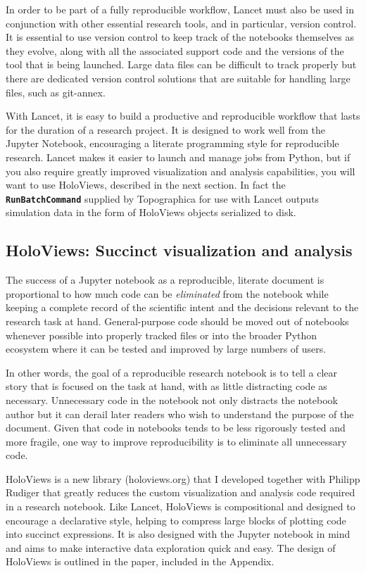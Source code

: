 \documentclass[phd,ianc,twoside]{infthesis}
\newcommand{\tbf}[1]{\texttt{\textbf{#1}}}
\begin{document}
In order to be part of a fully reproducible workflow, Lancet must also
be used in conjunction with other essential research tools, and in
particular, version control. It is essential to use version control to
keep track of the notebooks themselves as they evolve, along with all the
associated support code and the versions of the tool that is being
launched. Large data files can be difficult to track properly but there
are dedicated version control solutions that are suitable for handling
large files, such as \textsf{git-annex}.

With Lancet, it is easy to build a productive and reproducible workflow
that lasts for the duration of a research project. It is designed to
work well from the Jupyter Notebook, encouraging a literate programming
style for reproducible research. Lancet makes it easier to launch and
manage jobs from Python, but if you also require greatly improved
visualization and analysis capabilities, you will want to use HoloViews,
described in the next section. In fact the \tbf{RunBatchCommand}
supplied by Topographica for use with Lancet outputs simulation data in
the form of HoloViews objects serialized to disk.


\subsection{HoloViews: Succinct visualization and analysis}

The success of a Jupyter notebook as a reproducible, literate document
is proportional to how much code can be \emph{eliminated} from the
notebook while keeping a complete record of the scientific intent and the decisions
relevant to the research task at hand. General-purpose code should be
moved out of notebooks whenever possible into properly tracked files or
into the broader Python ecosystem where it can be tested and
improved by large numbers of users.

In other words, the goal of a reproducible research notebook is to tell
a clear story that is focused on the task at hand, with as little
distracting code as necessary. Unnecessary code in the notebook not only
distracts the notebook author but it can derail later readers who wish
to understand the purpose of the document. Given that code in notebooks
tends to be less rigorously tested and more fragile, one way to improve
reproducibility is to eliminate all unnecessary code.

HoloViews is a new library ({\sf holoviews.org}) that I developed
together with Philipp Rudiger that greatly reduces
the custom visualization and analysis code required in a research
notebook. Like Lancet, HoloViews is compositional and designed to encourage a
declarative style, helping to compress large blocks of plotting code
into succinct expressions. It is also designed with the Jupyter notebook
in mind and aims to make interactive data exploration quick and
easy. The design of HoloViews is outlined in the \citet{stevens_scipy15}
paper, included in the Appendix.
\end{document}

